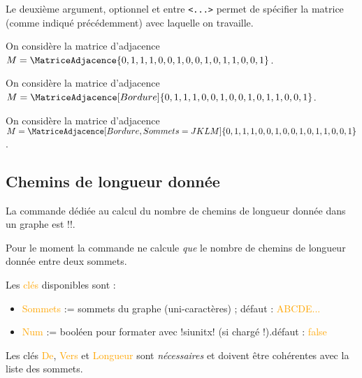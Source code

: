 \documentclass[french,a4paper,11pt]{article}
\newcommand\Cle[1]{{\small\sffamily\textlangle \textcolor{orange}{#1}\textrangle}}
\begin{document}
{{\begin{tipblock}
Le deuxième argument, optionnel et entre \texttt{<...>} permet de spécifier la matrice (comme indiqué précédemment) avec laquelle on travaille.
\end{tipblock}

\begin{DemoCode}[]
\def\MatriceAdj{{{0,1,1,1},{0,0,1,0},{0,1,0,1},{1,0,0,1}}}
On considère la matrice d'adjacence $M = \MatriceAdjacence{\MatriceAdj}$.\par
On considère la matrice d'adjacence $M = \MatriceAdjacence[Bordure]{\MatriceAdj}$.\par
On considère la matrice d'adjacence $M = \MatriceAdjacence[Bordure,Sommets=JKLM]{\MatriceAdj}$.\par
\end{DemoCode}

\subsection{Chemins de longueur donnée}

\begin{cautionblock}
La commande dédiée au calcul du nombre de chemins de longueur donnée dans un graphe est \motcletex!\NbCheminsLongueur!.

\smallskip

Pour le moment la commande ne calcule \textit{que} le nombre de chemins de longueur donnée entre deux sommets.
\end{cautionblock}

\begin{DemoCode}
\end{DemoCode}

\begin{tipblock}
Les \Cle{clés} disponibles sont :

\begin{itemize}
	\item \Cle{Sommets} := sommets du graphe (uni-caractères) ; \hfill{}défaut : \Cle{ABCDE...}
	\item \Cle{Num} := booléen pour formater avec \packagetex!siunitx! (si chargé !).\hfill{}défaut : \Cle{false}
\end{itemize}

Les clés \Cle{De}, \Cle{Vers} et \Cle{Longueur} sont \textit{nécessaires} et doivent être cohérentes avec la liste des sommets.
\end{tipblock}

}}
\end{document}
